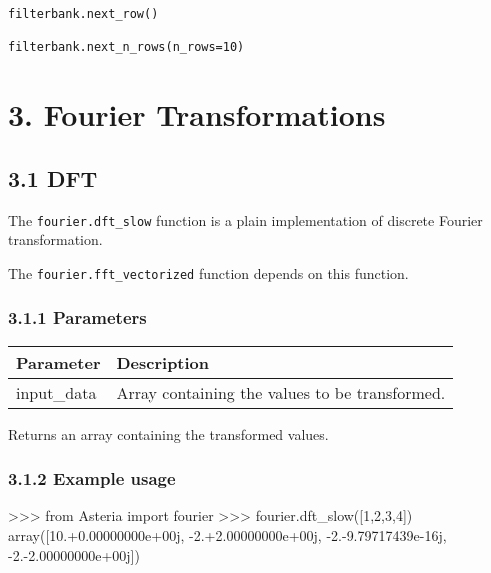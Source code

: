 \documentclass[]{article}
\newenvironment{Shaded}{}{}
\newcommand{\DecValTok}[1]{\textcolor[rgb]{0.25,0.63,0.44}{#1}}
\newcommand{\FloatTok}[1]{\textcolor[rgb]{0.25,0.63,0.44}{#1}}
\newcommand{\ImportTok}[1]{#1}
\newcommand{\OperatorTok}[1]{\textcolor[rgb]{0.40,0.40,0.40}{#1}}
\newcommand{\NormalTok}[1]{#1}
\begin{document}
\begin{verbatim}
filterbank.next_row()

filterbank.next_n_rows(n_rows=10)
\end{verbatim}

\section{3. Fourier Transformations}\label{fourier-transformations}

\subsection{3.1 DFT}\label{dft}

The \texttt{fourier.dft\_slow} function is a plain implementation of
discrete Fourier transformation.

The \texttt{fourier.fft\_vectorized} function depends on this function.

\subsubsection{3.1.1 Parameters}\label{parameters}

\begin{longtable}[]{@{}ll@{}}
\toprule
Parameter & Description\tabularnewline
\midrule
\endhead
input\_data & Array containing the values to be
transformed.\tabularnewline
\bottomrule
\end{longtable}

Returns an array containing the transformed values.

\subsubsection{3.1.2 Example usage}\label{example-usage}

\begin{Shaded}
\begin{Highlighting}[]
\OperatorTok{>>>} \ImportTok{from}\NormalTok{ Asteria }\ImportTok{import}\NormalTok{ fourier}
\OperatorTok{>>>}\NormalTok{ fourier.dft_slow([}\DecValTok{1}\NormalTok{,}\DecValTok{2}\NormalTok{,}\DecValTok{3}\NormalTok{,}\DecValTok{4}\NormalTok{])}
\NormalTok{array([}\DecValTok{10}\NormalTok{.}\OperatorTok{+}\FloatTok{0.}\NormalTok{00000000e}\OperatorTok{+}\NormalTok{00j, }\OperatorTok{-}\DecValTok{2}\NormalTok{.}\OperatorTok{+}\FloatTok{2.}\NormalTok{00000000e}\OperatorTok{+}\NormalTok{00j, }\OperatorTok{-}\DecValTok{2}\NormalTok{.}\OperatorTok{-}\FloatTok{9.}\NormalTok{79717439e}\OperatorTok{-}\NormalTok{16j, }\OperatorTok{-}\DecValTok{2}\NormalTok{.}\OperatorTok{-}\FloatTok{2.}\NormalTok{00000000e}\OperatorTok{+}\NormalTok{00j])}
\end{Highlighting}
\end{Shaded}
\end{document}
